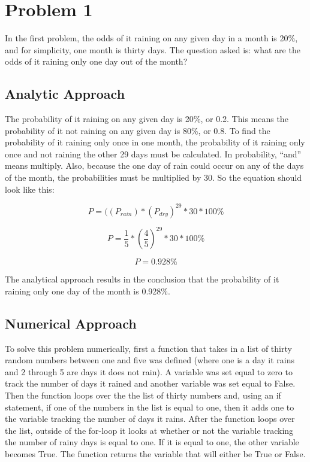 \documentclass[twocolumn]{revtex4}
\begin{document}
\section{Problem 1}

	In the first problem, the odds of it raining on any given day in a month is 20\%, and
	for simplicity, one month is thirty days. The question asked is: what are the odds of it 
	raining only one day out of the month?
	
	\subsection{Analytic Approach}
	
	The probability of it raining on any given day is 20\%, or 0.2. This means the probability
	of it not raining on any given day is 80\%, or 0.8. To find the probability of it raining only 
	once in one month, the probability of it raining only once and not raining the other 29
	days must be calculated. In probability, ``and'' means multiply. Also, because the one 
	day of rain could occur on any of the days of the month, the probabilities must be 
	multiplied by 30. So the equation should look like this: 
	
	$$P = ((P_{rain}) * (P_{dry})^{29} * 30* 100\%$$
	
	$$P = \frac{1}{5} * (\frac{4}{5})^{29} * 30 * 100\%$$
	
	$$P = 0.928\%$$
	
	The analytical approach results in the conclusion that the probability of it raining only 
	one day of the month is 0.928\%.
	
	\subsection{Numerical Approach}
	
	To solve this problem numerically, first a function
	that takes in a list of thirty random numbers between one and five was defined (where 
	one is a day it rains and 2 through 5 are days it does not rain).  A variable was set
	equal to zero to track the number of days it rained and another variable was set equal 
	to False. Then the function loops over the the list of thirty numbers and, using an if 
	statement, if one of the numbers in the list is equal to one, then it adds one to the 
	variable tracking the number of days it rains. After the function loops over the list, 
	outside of the for-loop it looks at whether or not the variable 
	tracking the number of rainy days is equal to one. If it is equal to one, the other variable 
	becomes True. The function returns the variable that will either be True or False.
	
\end{document}
